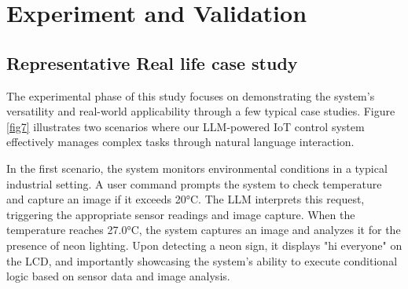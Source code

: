 \documentclass{ieeeaccess}
\begin{document}








\section{Experiment and Validation}\label{sec:experiment}


\subsection{Representative Real life case study}
The experimental phase of this study focuses on demonstrating the system's versatility and real-world applicability through a few typical case studies. Figure \ref{fig7} illustrates two scenarios where our LLM-powered IoT control system effectively manages complex tasks through natural language interaction.

In the first scenario, the system monitors environmental conditions in a typical industrial setting. A user command prompts the system to check temperature and capture an image if it exceeds 20°C. The LLM interprets this request, triggering the appropriate sensor readings and image capture. When the temperature reaches 27.0°C, the system captures an image and analyzes it for the presence of neon lighting. Upon detecting a neon sign, it displays "hi everyone" on the LCD, and importantly showcasing the system's ability to execute conditional logic based on sensor data and image analysis.
\end{document}
